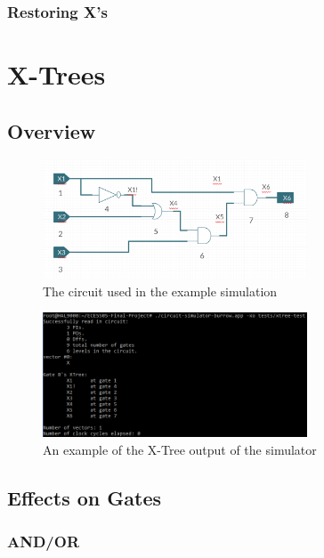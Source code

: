 \documentclass[12pt]{report}
\begin{document}
\subsection{Restoring X's}

\chapter{X-Trees}
\label{sec:xtree}

\section{Overview}

\begin{figure}[h]
	\centering
	\includegraphics[width=0.7\textwidth]{xtree-circuit.png}
	\caption[X-Tree Circuit]{The circuit used in the example simulation}
	\label{fig:xtree-ckt}
\end{figure}

\begin{figure}[h]
	\centering
	\includegraphics[width=0.7\textwidth]{sim-output.png}
	\caption[X-Tree Output]{An example of the X-Tree output of the simulator}
	\label{fig:sim-output}
\end{figure}

\section{Effects on Gates}

\subsection{AND/OR}
\end{document}
